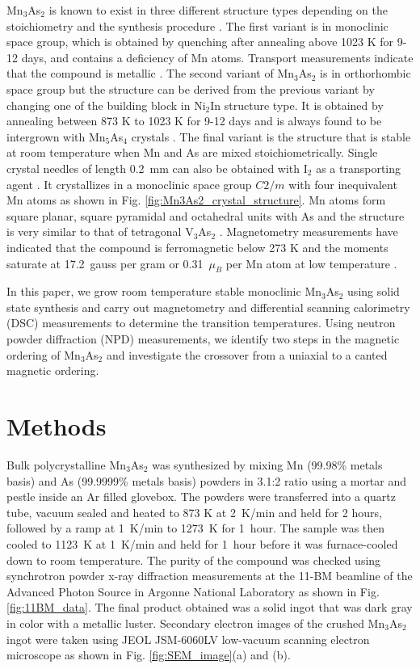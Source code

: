 \documentclass[10pt,doublespacing,edeposit]{uiucthesis2020}
\begin{document}
\begin{mainmatter}
Mn$_3$As$_2$ is known to exist in three different structure types depending on the stoichiometry and the synthesis procedure \cite{Dietrich1990,Moller1993,Hagedorn1994}. The first variant is in monoclinic space group, which is obtained by quenching after annealing above 1023 K for 9-12 days, and contains a deficiency of Mn atoms. Transport measurements indicate that the compound is metallic \cite{Dietrich1990}. The second variant of Mn$_3$As$_2$ is in orthorhombic space group but the structure can be derived from the previous variant by changing one of the building block in Ni$_2$In structure type.
It is obtained by annealing between 873 K to 1023 K for 9-12 days and is always found to be intergrown with Mn$_5$As$_4$ crystals \cite{Moller1993}. The final variant is the structure that is stable at room temperature when Mn and As are mixed stoichiometrically. 
Single crystal needles of length 0.2~mm can also be obtained with I$_2$ as a transporting agent \cite{Hagedorn1994}.
It crystallizes in a monoclinic space group $C2/m$ with four inequivalent Mn atoms as shown in Fig. \ref{fig:Mn3As2_crystal_structure}. Mn atoms form square planar, square pyramidal and octahedral units with As and the structure is very similar to that of tetragonal V$_3$As$_2$ \cite{Hagedorn1994,Hagedorn1995}. Magnetometry measurements have indicated that the compound is ferromagnetic below 273 K and the moments saturate at 17.2~gauss per gram or 0.31~$\mu_B$ per Mn atom at low temperature \cite{Yuzuri1960}. 


In this paper, we grow room temperature stable monoclinic Mn$_3$As$_2$ using solid state synthesis and carry out magnetometry and differential scanning calorimetry (DSC) measurements to determine the transition temperatures. Using neutron powder diffraction (NPD) measurements, we identify two steps in the magnetic ordering of Mn$_3$As$_2$ and  investigate the crossover from a uniaxial to a canted magnetic  ordering.





\section{Methods}


Bulk polycrystalline Mn$_3$As$_2$ was synthesized by mixing Mn (99.98\% metals basis) and As (99.9999\% metals basis) powders in 3.1:2 ratio using a mortar and pestle inside an Ar filled glovebox. The powders were transferred into a quartz tube, vacuum sealed and heated to 873 K at 2~K/min and held for 2 hours, followed by a ramp at 1~K/min to 1273~K for 1~hour. The sample was then cooled to 1123~K at 1~K/min and held for 1~hour before it was furnace-cooled down to room temperature. The purity of the compound was checked using synchrotron powder x-ray diffraction measurements at the 11-BM beamline of the Advanced Photon Source in Argonne National Laboratory as shown in Fig. \ref{fig:11BM_data}. The final product obtained was a solid ingot that was dark gray in color with a metallic luster. Secondary electron images of the crushed Mn$_3$As$_2$ ingot were taken using JEOL JSM-6060LV low-vacuum scanning electron microscope as shown in Fig. \ref{fig:SEM_image}(a) and (b).


\end{mainmatter}
\end{document}

